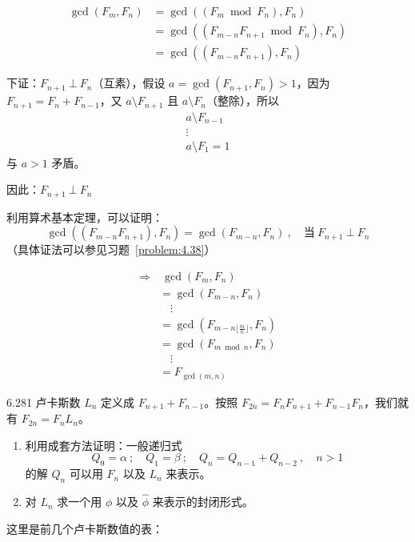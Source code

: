 \begin{align*}
  \gcd{(F_m, F_n)} &= \gcd{((F_m \bmod F_n), F_n)} \\
  &= \gcd{((F_{m-n} F_{n+1} \bmod F_n), F_n)} \\
  &= \gcd{((F_{m-n} F_{n+1}), F_n)}
\end{align*}

下证：\( F_{n+1} \ \bot \ F_n \)（互素），假设 \( a = \gcd{(F_{n+1}, F_n)} > 1 \)，因为 \( F_{n+1} = F_n + F_{n-1} \)，又 \( a \setminus F_{n+1} \) 且 \( a \setminus F_n \)（整除），所以
\begin{gather*}
  a \setminus F_{n-1} \\
  \vdots \\
  a \setminus F_1 = 1
\end{gather*}
与 \( a > 1 \) 矛盾。

因此：\( F_{n+1} \ \bot \ F_n \)

利用算术基本定理，可以证明：
\[
  \gcd{((F_{m-n} F_{n+1}), F_n)} = \gcd{(F_{m-n}, F_n)} \ , \quad \text{当} \ F_{n+1} \ \bot \ F_n
\]
（具体证法可以参见习题~\ref{problem:4.38}）

\begin{align*}
  \Rightarrow & \ \gcd{(F_m, F_n)} \\
  &= \gcd{(F_{m-n}, F_n)} \\
  & \quad \vdots \\
  &= \gcd{(F_{m-n \lfloor \frac{m}{n} \rfloor}, F_n)} \\
  &= \gcd{(F_{m \bmod n}, F_n)} \\
  & \quad \vdots \\
  &= F_{\gcd{(m, n)}}
\end{align*}

\begin{problem}{6.28}{1}
  卢卡斯数 \( L_n \) 定义成 \( F_{n+1} + F_{n-1} \)。按照 \( F_{2n} = F_n F_{n+1} + F_{n-1} F_n \)，我们就有 \( F_{2n} = F_n L_n \)。
  \begin{enumerate}
    \item [a] 利用成套方法证明：一般递归式
      \[
        Q_0 = \alpha \ ; \quad Q_1 = \beta \ ; \quad Q_n = Q_{n-1} + Q_{n-2} \ , \quad n > 1
      \]
      的解 \( Q_n \) 可以用 \( F_n \) 以及 \( L_n \) 来表示。
    \item[b] 对 \( L_n \) 求一个用 \( \phi \) 以及 \( \hat{\phi} \) 来表示的封闭形式。
  \end{enumerate}
\end{problem}

这里是前几个卢卡斯数值的表：

